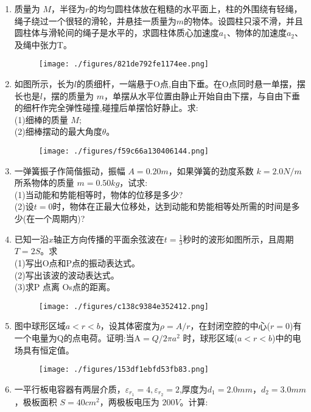 
\begin{enumerate}
\item 质量为 $M$，半径为$r$的均匀圆柱体放在粗糙的水平面上，柱的外围绕有轻绳，绳子绕过一个很轻的滑轮，并悬挂一质量为$m $的物体。设圆柱只滚不滑，并且圆柱体与滑轮间的绳子是水平的，求圆柱体质心加速度$ a_1$、物体的加速度$ a_2$、及绳中张力T。
\begin{figure}[ht]
\centering
\texttt{[image: ./figures/821de792fe1174ee.png]}
\caption{} \label{fig_SD05_1}
\end{figure}
\item 如图所示，长为$l$的质细杆，一端悬于O点,自由下垂。在O点同时悬一单摆，摆长也是$l$，摆的质量为 $m$，单摆从水平位置由静止开始自由下摆，与自由下垂的细杆作完全弹性碰撞,碰撞后单摆恰好静止。求:\\
(1)细棒的质量 $M;$\\
(2)细棒摆动的最大角度$\theta$。
\begin{figure}[ht]
\centering
\texttt{[image: ./figures/f59c66a130406144.png]}
\caption{} \label{fig_SD05_2}
\end{figure}
\item 一弹簧振子作简偕振动，振幅 $A=0.20m$，如果弹簧的劲度系数 $k=2.0N/m$所系物体的质量 $m=0.50kg$，试求:\\
(1)当动能和势能相等时，物体的位移是多少?\\
(2)设$t=0$时，物体在正最大位移处，达到动能和势能相等处所需的时间是多少(在一个周期内)?
\item 已知一沿$x$轴正方向传播的平面余弦波在$t=\frac{1}{3}$秒时的波形如图所示，且周期$T=2S$。求\\
(1)写出O点和P点的振动表达式。\\
(2)写出该波的波动表达式。\\
(3)求P 点离 Os点的距离。
\begin{figure}[ht]
\centering
\texttt{[image: ./figures/c138c9384e352412.png]}
\caption{} \label{fig_SD05_3}
\end{figure}
\item 图中球形区域$a<r<b$，设其体密度为$\rho=A/r$，在封闭空腔的中心($r=0$)有一个电量为Q的点电荷。证明:当A$=Q/2\pi a^2$ 时，球形区域($a<r<b$)中的电场具有恒定值。
\begin{figure}[ht]
\centering
\texttt{[image: ./figures/153df1ebfd53fb83.png]}
\caption{} \label{fig_SD05_4}
\end{figure}
\item 一平行板电容器有两层介质，$\varepsilon_{r_1}=4,\varepsilon_{r_2}=2$,厚度为$ d_1=2.0mm$，$d_2=3.0mm$，极板面积 $S=40cm^2$，两极板电压为 $200V$。计算:\\

\end{enumerate}
